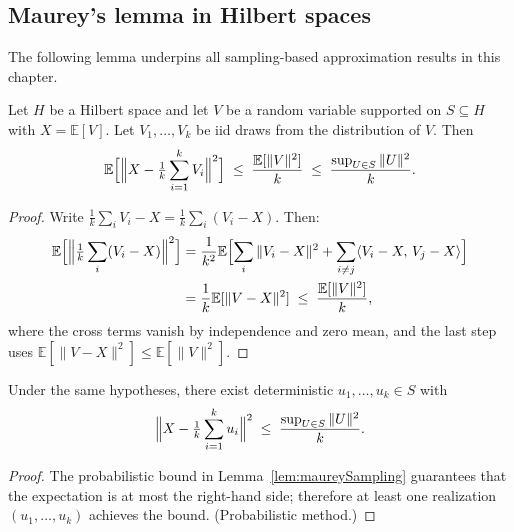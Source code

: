 \subsection{Maurey's lemma in Hilbert spaces}

The following lemma underpins all sampling-based approximation results in this chapter.

\begin{lemma}\label{lem:maureySampling}
Let $H$ be a Hilbert space and let $V$ be a random variable supported on $S \subseteq H$
with $X = \mathbb{E}[V]$.  Let $V_1, \ldots, V_k$ be iid draws from the distribution of $V$.
Then
\[
  \mathbb{E}\Bigl[\Bigl\|X - \tfrac{1}{k}\sum_{i=1}^k V_i\Bigr\|^2\Bigr]
  \;\le\; \frac{\mathbb{E}[\|V\|^2]}{k}
  \;\le\; \frac{\sup_{U \in S} \|U\|^2}{k}.
\]
\end{lemma}

\begin{proof}
Write $\frac{1}{k}\sum_i V_i - X = \frac{1}{k}\sum_i (V_i - X)$.  Then:
\begin{align*}
  \mathbb{E}\Bigl[\Bigl\|\tfrac{1}{k}\sum_i (V_i - X)\Bigr\|^2\Bigr]
  &= \frac{1}{k^2} \mathbb{E}\Bigl[\sum_i \|V_i - X\|^2
    + \sum_{i \ne j} \langle V_i - X,\, V_j - X\rangle\Bigr] \\
  &= \frac{1}{k} \mathbb{E}[\|V - X\|^2]
  \;\le\; \frac{\mathbb{E}[\|V\|^2]}{k},
\end{align*}
where the cross terms vanish by independence and zero mean, and the last step uses
$\mathbb{E}[\|V - X\|^2] \le \mathbb{E}[\|V\|^2]$.
\end{proof}

\begin{lemma}\label{lem:maureySamplingExistence}
Under the same hypotheses, there exist deterministic $u_1, \ldots, u_k \in S$ with
\[
  \Bigl\|X - \tfrac{1}{k}\sum_{i=1}^k u_i\Bigr\|^2
  \;\le\; \frac{\sup_{U \in S} \|U\|^2}{k}.
\]
\end{lemma}

\begin{proof}
The probabilistic bound in Lemma~\ref{lem:maureySampling} guarantees that the expectation
is at most the right-hand side; therefore at least one realization $(u_1, \ldots, u_k)$
achieves the bound. (Probabilistic method.)
\end{proof}


